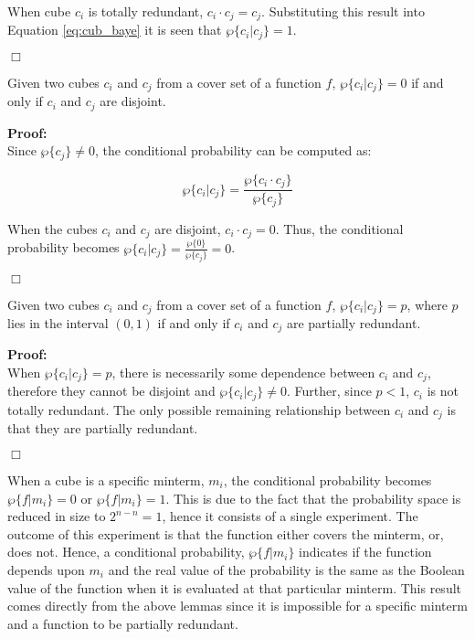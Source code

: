 When cube $c_i$ is totally redundant, $c_i \cdot c_j = c_j$.  Substituting
this result into Equation \ref{eq:cub_baye} it is seen that
$\wp \{ c_i | c_j \} = 1$.  

\hfill $\Box$

\begin{lemma}   \label{disjoint}
Given two cubes $c_i$ and $c_j$ from a cover set of a function $f$,
$\wp \{ c_i | c_j \} = 0$ if and only if $c_i$ and $c_j$ are disjoint.
\end{lemma}

\noindent
{\bf Proof:} \\
Since $\wp \{ c_j \} \neq 0$, the conditional probability can be computed 
as:

\begin{equation}
\wp \{ c_i | c_j \} = \frac{ \wp \{ c_i \cdot c_j \} }{ \wp \{ c_j \}}
\end{equation}

When the cubes $c_i$ and $c_j$ are disjoint, $c_i \cdot c_j  = 0$.
Thus, the conditional probability becomes 
$\wp \{ c_i | c_j \} = \frac{ \wp \{ 0 \} } { \wp \{ c_j \}} = 0$.

\hfill $\Box$

\begin{lemma}   \label{par_redun}
Given two cubes $c_i$ and $c_j$ from a cover set of a function $f$,
$\wp \{ c_i | c_j \} = p$, where $p$ lies in the interval $(0,1)$
if and only if $c_i$ and $c_j$ are partially redundant.
\end{lemma}

\noindent
{\bf Proof:} \\
When $\wp \{ c_i | c_j \} = p$, there is necessarily some dependence between
$c_i$ and $c_j$, therefore they cannot be disjoint and $\wp \{ c_i | c_j \} \neq 0$.
Further, since $p < 1$, $c_i$ is not totally redundant.  The only possible remaining
relationship between $c_i$ and $c_j$ is that they are partially redundant.

\hfill $\Box$

When a cube is a specific minterm, $m_i$, the conditional probability becomes
$\wp \{ f | m_i \} = 0$ or $\wp \{f | m_i \} = 1$.  This is due to the
fact that the probability space is reduced in size to $2^{n-n} = 1$, hence
it consists of a single experiment.  The outcome of this experiment is that the
function either covers the minterm, or, does not.  Hence, a conditional
probability, $\wp \{ f | m_i \}$ indicates if the function depends upon $m_i$ and
the real value of the probability is the same as the Boolean value of the function when it is
evaluated at that particular minterm.  This result comes directly from the above lemmas 
since it is impossible for a specific minterm and a function to be partially redundant.

